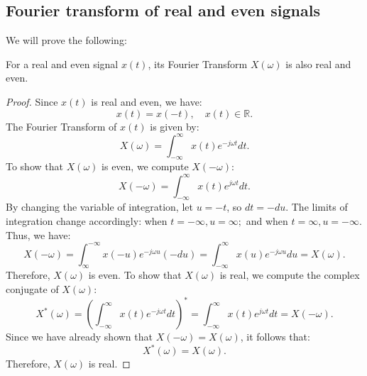 \documentclass{ee102_notes}
\begin{document}
\subsection{Fourier transform of real and even signals}
We will prove the following:

\begin{proposition}
    For a real and even signal $x(t)$, its Fourier Transform $X(\omega)$ is also real and even.
    \end{proposition}
\begin{proof}
    Since $x(t)$ is real and even, we have:
    \[
    x(t) = x(-t), \quad x(t) \in \mathbb{R}.
    \]
    The Fourier Transform of $x(t)$ is given by:
    \[
    X(\omega) = \int_{-\infty}^{\infty} x(t) e^{-j \omega t} dt.
    \]
    To show that $X(\omega)$ is even, we compute $X(-\omega)$:
    \[
    X(-\omega) = \int_{-\infty}^{\infty} x(t) e^{j \omega t} dt.
    \]
    By changing the variable of integration, let $u = -t$, so $dt = -du$. The limits of integration change accordingly: when $t = -\infty, u = \infty;$ and when $t = \infty, u = -\infty$. Thus, we have:
    \[
    X(-\omega) = \int_{\infty}^{-\infty} x(-u) e^{-j \omega u} (-du) = \int_{-\infty}^{\infty} x(u) e^{-j \omega u} du = X(\omega).
    \]
    Therefore, $X(\omega)$ is even.
    To show that $X(\omega)$ is real, we compute the complex conjugate of $X(\omega)$:
    \[
    X^*(\omega) = \left( \int_{-\infty}^{\infty} x(t) e^{-j \omega t} dt \right)^* = \int_{-\infty}^{\infty} x(t) e^{j \omega t} dt = X(-\omega).
    \]
    Since we have already shown that $X(-\omega) = X(\omega)$, it follows that:
    \[
    X^*(\omega) = X(\omega).
    \]
    Therefore, $X(\omega)$ is real.
    \end{proof}
\end{document}
